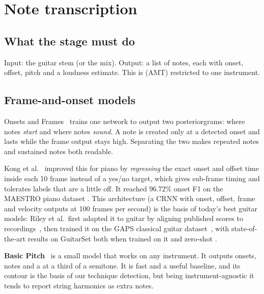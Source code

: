 \section{Note transcription}
\label{sec:notes}

\subsection{What the stage must do}

Input: the guitar stem (or the mix). Output: a list of notes, each with onset,
offset, pitch and a loudness estimate. This is  (AMT) restricted to one instrument.

\subsection{Frame-and-onset models}

\begin{keyidea}
Onsets and Frames~\cite{hawthorne2018onsets} trains one network to output two
posteriorgrams: where notes \emph{start} and where notes \emph{sound}. A note is
created only at a detected onset and lasts while the frame output stays high.
Separating the two makes repeated notes and sustained notes both readable.
\end{keyidea}

Kong et al.~\cite{kong2021highres} improved this for piano by \emph{regressing}
the exact onset and offset time inside each 10\ms{} frame instead of a yes/no
target, which gives sub-frame timing and tolerates labels that are a little off.
It reached 96.72\% onset F1 on the MAESTRO piano dataset \reported. This
architecture (a CRNN with onset, offset, frame and velocity outputs at 100
frames per second) is the basis of today's best guitar models: Riley et al.\
first adapted it to guitar by aligning published scores to
recordings~\cite{riley2024domain}, then trained it on the GAPS classical guitar
dataset~\cite{riley2024gaps}, with state-of-the-art results on GuitarSet both
when trained on it and zero-shot \reported.

\textbf{Basic Pitch}~\cite{bittner2022basicpitch} is a small model that works
on any instrument. It outputs onsets, notes and a \term{pitch contour} at a
third of a semitone. It is fast and a useful baseline, and its contour is the
basis of our technique detection, but being instrument-agnostic it tends to
report string harmonics as extra notes.

